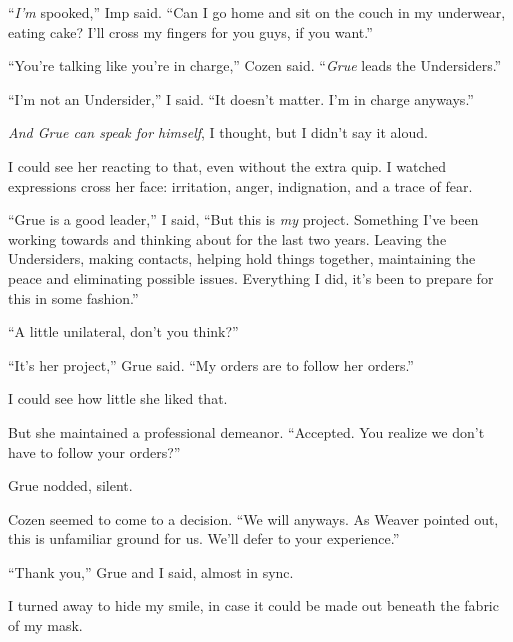 ``\emph{I'm} spooked,'' Imp said.  ``Can I go home and sit on the couch in my underwear, eating cake?  I'll cross my fingers for you guys, if you want.''



``You're talking like you're in charge,'' Cozen said.  ``\emph{Grue} leads the Undersiders.''



``I'm not an Undersider,'' I said.  ``It doesn't matter.  I'm in charge anyways.''



\emph{And Grue can speak for himself}, I thought, but I didn't say it aloud.



I could see her reacting to that, even without the extra quip.  I watched expressions cross her face: irritation, anger, indignation, and a trace of fear.



``Grue is a good leader,'' I said, ``But this is \emph{my} project.  Something I've been working towards and thinking about for the last two years.  Leaving the Undersiders, making contacts, helping hold things together, maintaining the peace and eliminating possible issues.  Everything I did, it's been to prepare for this in some fashion.''



``A little unilateral, don't you think?''



``It's her project,'' Grue said.  ``My orders are to follow her orders.''



I could see how little she liked that.



But she maintained a professional demeanor.  ``Accepted.  You realize we don't have to follow your orders?''



Grue nodded, silent.



Cozen seemed to come to a decision.  ``We will anyways.  As Weaver pointed out, this is unfamiliar ground for us.  We'll defer to your experience.''



``Thank you,'' Grue and I said, almost in sync.



I turned away to hide my smile, in case it could be made out beneath the fabric of my mask.



